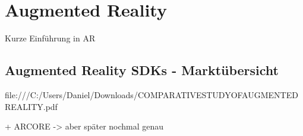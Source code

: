 \chapter{Augmented Reality}

Kurze Einführung in AR


\section{Augmented Reality SDKs -  Marktübersicht}


file:///C:/Users/Daniel/Downloads/COMPARATIVESTUDYOFAUGMENTEDREALITY.pdf

+
ARCORE
-> aber später nochmal genau